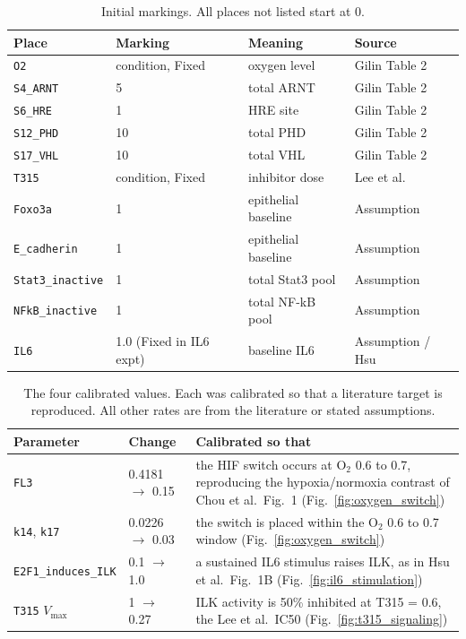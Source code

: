 \begin{table}[ht]\centering
\caption{Initial markings. All places not listed start at 0.}\label{tab:markings}
\begin{tabular}{@{}llll@{}}\toprule
Place & Marking & Meaning & Source \\ \midrule
\texttt{O2} & condition, Fixed & oxygen level & Gilin Table 2 \\
\texttt{S4\_ARNT} & 5 & total ARNT & Gilin Table 2 \\
\texttt{S6\_HRE} & 1 & HRE site & Gilin Table 2 \\
\texttt{S12\_PHD} & 10 & total PHD & Gilin Table 2 \\
\texttt{S17\_VHL} & 10 & total VHL & Gilin Table 2 \\
\texttt{T315} & condition, Fixed & inhibitor dose & Lee et al. \\
\texttt{Foxo3a} & 1 & epithelial baseline & Assumption \\
\texttt{E\_cadherin} & 1 & epithelial baseline & Assumption \\
\texttt{Stat3\_inactive} & 1 & total Stat3 pool & Assumption \\
\texttt{NFkB\_inactive} & 1 & total NF-kB pool & Assumption \\
\texttt{IL6} & 1.0 (Fixed in IL6 expt) & baseline IL6 & Assumption / Hsu \\
\bottomrule\end{tabular}\end{table}

\begin{table}[ht]\centering
\caption{The four calibrated values. Each was calibrated so that a literature target is reproduced. All other rates are from the literature or stated assumptions.}\label{tab:calibrated}
\begin{tabular}{@{}llp{9cm}@{}}\toprule
Parameter & Change & Calibrated so that \\ \midrule
\texttt{FL3} & 0.4181 $\to$ 0.15 & the HIF switch occurs at O$_2$ 0.6 to 0.7, reproducing the hypoxia/normoxia contrast of Chou et al.\ Fig.~1 (Fig.~\ref{fig:oxygen_switch}) \\
\texttt{k14}, \texttt{k17} & 0.0226 $\to$ 0.03 & the switch is placed within the O$_2$ 0.6 to 0.7 window (Fig.~\ref{fig:oxygen_switch}) \\
\texttt{E2F1\_induces\_ILK} & 0.1 $\to$ 1.0 & a sustained IL6 stimulus raises ILK, as in Hsu et al.\ Fig.~1B (Fig.~\ref{fig:il6_stimulation}) \\
\texttt{T315} $V_{\max}$ & 1 $\to$ 0.27 & ILK activity is 50\% inhibited at T315 = 0.6, the Lee et al.\ IC50 (Fig.~\ref{fig:t315_signaling}) \\
\bottomrule\end{tabular}\end{table}
